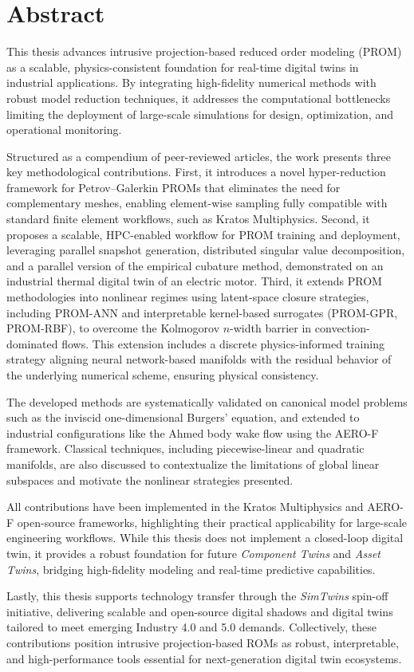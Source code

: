 \chapter*{Abstract}

\noindent
This thesis advances intrusive projection-based reduced order modeling (PROM) as a scalable, physics-consistent foundation for real-time digital twins in industrial applications. By integrating high-fidelity numerical methods with robust model reduction techniques, it addresses the computational bottlenecks limiting the deployment of large-scale simulations for design, optimization, and operational monitoring.

Structured as a compendium of peer-reviewed articles, the work presents three key methodological contributions. First, it introduces a novel hyper-reduction framework for Petrov–Galerkin PROMs that eliminates the need for complementary meshes, enabling element-wise sampling fully compatible with standard finite element workflows, such as Kratos Multiphysics. Second, it proposes a scalable, HPC-enabled workflow for PROM training and deployment, leveraging parallel snapshot generation, distributed singular value decomposition, and a parallel version of the empirical cubature method, demonstrated on an industrial thermal digital twin of an electric motor. Third, it extends PROM methodologies into nonlinear regimes using latent-space closure strategies, including PROM-ANN and interpretable kernel-based surrogates (PROM-GPR, PROM-RBF), to overcome the Kolmogorov $n$-width barrier in convection-dominated flows. This extension includes a discrete physics-informed training strategy aligning neural network-based manifolds with the residual behavior of the underlying numerical scheme, ensuring physical consistency.

The developed methods are systematically validated on canonical model problems such as the inviscid one-dimensional Burgers' equation, and extended to industrial configurations like the Ahmed body wake flow using the AERO-F framework. Classical techniques, including piecewise-linear and quadratic manifolds, are also discussed to contextualize the limitations of global linear subspaces and motivate the nonlinear strategies presented.

All contributions have been implemented in the Kratos Multiphysics and AERO-F open-source frameworks, highlighting their practical applicability for large-scale engineering workflows. While this thesis does not implement a closed-loop digital twin, it provides a robust foundation for future \textit{Component Twins} and \textit{Asset Twins}, bridging high-fidelity modeling and real-time predictive capabilities.

Lastly, this thesis supports technology transfer through the \textit{SimTwins} spin-off initiative, delivering scalable and open-source digital shadows and digital twins tailored to meet emerging Industry 4.0 and 5.0 demands. Collectively, these contributions position intrusive projection-based ROMs as robust, interpretable, and high-performance tools essential for next-generation digital twin ecosystems.
